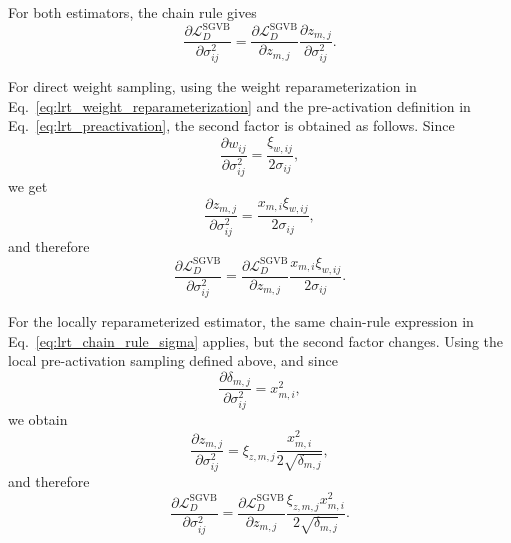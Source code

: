 For both estimators, the chain rule gives
\begin{equation}
\frac{\partial \mathcal{L}_{D}^{\mathrm{SGVB}}}{\partial \sigma_{ij}^{2}}
=
\frac{\partial \mathcal{L}_{D}^{\mathrm{SGVB}}}{\partial z_{m,j}}
\frac{\partial z_{m,j}}{\partial \sigma_{ij}^{2}}.
\label{eq:lrt_chain_rule_sigma}
\end{equation}

For direct weight sampling, using the weight reparameterization in Eq.~\eqref{eq:lrt_weight_reparameterization} and the pre-activation definition in Eq.~\eqref{eq:lrt_preactivation}, the second factor is obtained as follows. Since
\begin{equation}
\frac{\partial w_{ij}}{\partial \sigma_{ij}^{2}}
=
\frac{\xi_{w,ij}}{2\sigma_{ij}},
\end{equation}
we get
\begin{equation}
\frac{\partial z_{m,j}}{\partial \sigma_{ij}^{2}}
=
\frac{x_{m,i}\xi_{w,ij}}{2\sigma_{ij}},
\end{equation}
and therefore
\begin{equation}
\frac{\partial \mathcal{L}_{D}^{\mathrm{SGVB}}}{\partial \sigma_{ij}^{2}}
=
\frac{\partial \mathcal{L}_{D}^{\mathrm{SGVB}}}{\partial z_{m,j}}
\frac{x_{m,i}\xi_{w,ij}}{2\sigma_{ij}}.
\label{eq:lrt_direct_weight_estimator}
\end{equation}

For the locally reparameterized estimator, the same chain-rule expression in Eq.~\eqref{eq:lrt_chain_rule_sigma} applies, but the second factor changes. Using the local pre-activation sampling defined above, and since
\begin{equation}
\frac{\partial \delta_{m,j}}{\partial \sigma_{ij}^{2}}
=
x_{m,i}^{2},
\end{equation}
we obtain
\begin{equation}
\frac{\partial z_{m,j}}{\partial \sigma_{ij}^{2}}
=
\xi_{z,m,j}
\frac{x_{m,i}^{2}}{2\sqrt{\delta_{m,j}}},
\end{equation}
and therefore
\begin{equation}
\frac{\partial \mathcal{L}_{D}^{\mathrm{SGVB}}}{\partial \sigma_{ij}^{2}}
=
\frac{\partial \mathcal{L}_{D}^{\mathrm{SGVB}}}{\partial z_{m,j}}
\frac{\xi_{z,m,j}x_{m,i}^{2}}{2\sqrt{\delta_{m,j}}}.
\label{eq:lrt_local_estimator}
\end{equation}

